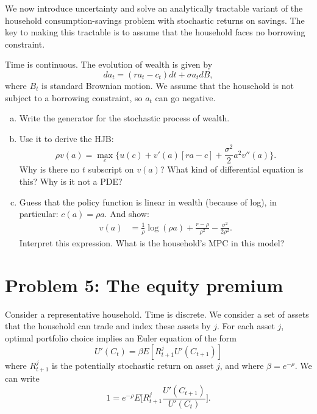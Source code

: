 \documentclass[11pt]{extarticle}
\theoremstyle{plain}
\theoremstyle{definition}
\begin{document}
We now introduce uncertainty and solve an analytically tractable variant of the household consumption-savings problem with stochastic returns on savings. The key to making this tractable is to assume that the household faces no borrowing constraint.


Time is continuous. The evolution of wealth is given by 
\begin{equation*}
	da_t = (r a_t - c_t)dt + \sigma a_t dB,
\end{equation*}
where $B_t$ is standard Brownian motion. We assume that the household is not subject to a borrowing constraint, so $a_t$ can go negative. 


\begin{enumerate}[(a)]
\item Write the generator for the stochastic process of wealth. 

\item Use it to derive the HJB:
\begin{equation*}
	\rho v(a) = \max_c \bigg\{ u(c) + v'(a)[ra -c] + \frac{\sigma^2}{2} a^2 v''(a) \bigg\}. 
\end{equation*}
Why is there no $t$ subscript on $v(a)$? What kind of differential equation is this? Why is it not a PDE?

\item Guess that the policy function is linear in wealth (because of log), in particular: $c(a) = \rho a$. And show: 
\begin{align*}
	v(a) &= \frac{1}{\rho} \log(\rho a) + \frac{r - \rho}{\rho^2} - \frac{\sigma^2}{2\rho^2}.
\end{align*} 
Interpret this expression. What is the household's MPC in this model? 

\end{enumerate}



\vspace{5mm}
\section*{Problem 5: The equity premium}

Consider a representative household. Time is discrete. We consider a set of assets that the household can trade and index these assets by $j$. For each asset $j$, optimal portfolio choice implies an Euler equation of the form
\begin{equation*}
	U'(C_t) = \beta E[R_{t+1}^j U'(C_{t+1})]
\end{equation*}
where $R_{t+1}^j$ is the potentially stochastic return on asset $j$, and where $\beta = e^{-\rho}$. We can write 
\begin{equation*}
	1 = e^{-\rho} E\bigg[R_{t+1}^j \frac{U'(C_{t+1})}{U'(C_t)} \bigg].
\end{equation*}
\end{document}

